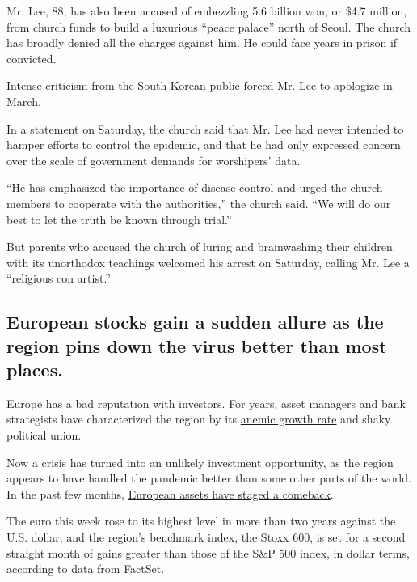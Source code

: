 Mr. Lee, 88, has also been accused of embezzling 5.6 billion won, or
\$4.7 million, from church funds to build a luxurious ``peace palace''
north of Seoul. The church has broadly denied all the charges against
him. He could face years in prison if convicted.

Intense criticism from the South Korean public
\href{https://www.nytimes.com/2020/03/02/world/asia/coronavirus-south-korea-shincheonji.html}{forced
Mr. Lee to apologize} in March.

In a statement on Saturday, the church said that Mr. Lee had never
intended to hamper efforts to control the epidemic, and that he had only
expressed concern over the scale of government demands for worshipers'
data.

``He has emphasized the importance of disease control and urged the
church members to cooperate with the authorities,'' the church said.
``We will do our best to let the truth be known through trial.''

But parents who accused the church of luring and brainwashing their
children with its unorthodox teachings welcomed his arrest on Saturday,
calling Mr. Lee a ``religious con artist.''

\hypertarget{european-stocks-gain-a-sudden-allure-as-the-region-pins-down-the-virus-better-than-most-places}{%
\subsection{European stocks gain a sudden allure as the region pins down
the virus better than most
places.}\label{european-stocks-gain-a-sudden-allure-as-the-region-pins-down-the-virus-better-than-most-places}}

Europe has a bad reputation with investors. For years, asset managers
and bank strategists have characterized the region by its
\href{https://qz.com/1544961/the-euro-zone-economy-is-back-on-familiar-ground-slow-grinding-growth/}{anemic
growth rate} and shaky political union.

Now a crisis has turned into an unlikely investment opportunity, as the
region appears to have handled the pandemic better than some other parts
of the world. In the past few months,
\href{https://www.nytimes.com/2020/07/30/business/europes-markets-are-having-a-moment.html}{European
assets have staged a comeback}.

The euro this week rose to its highest level in more than two years
against the U.S. dollar, and the region's benchmark index, the Stoxx
600, is set for a second straight month of gains greater than those of
the S\&P 500 index, in dollar terms, according to data from FactSet.

